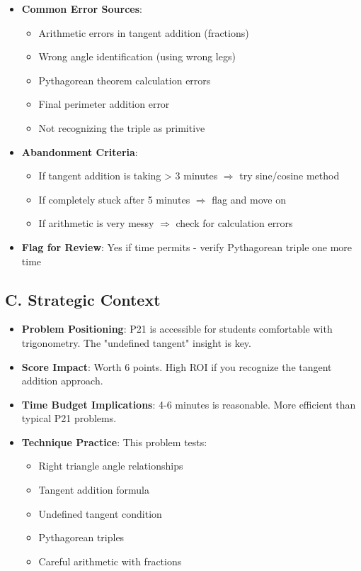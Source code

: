 \documentclass[12pt]{article}
\begin{document}
\begin{competitionbox}
\begin{itemize}[leftmargin=*]
    \item \textbf{Common Error Sources}:
    \begin{itemize}
        \item Arithmetic errors in tangent addition (fractions)
        \item Wrong angle identification (using wrong legs)
        \item Pythagorean theorem calculation errors
        \item Final perimeter addition error
        \item Not recognizing the triple as primitive
    \end{itemize}
    
    \item \textbf{Abandonment Criteria}: 
    \begin{itemize}
        \item If tangent addition is taking > 3 minutes $\Rightarrow$ try sine/cosine method
        \item If completely stuck after 5 minutes $\Rightarrow$ flag and move on
        \item If arithmetic is very messy $\Rightarrow$ check for calculation errors
    \end{itemize}
    
    \item \textbf{Flag for Review}: Yes if time permits - verify Pythagorean triple one more time
\end{itemize}

\subsection*{C. Strategic Context}
\begin{itemize}[leftmargin=*]
    \item \textbf{Problem Positioning}: P21 is accessible for students comfortable with trigonometry. The "undefined tangent" insight is key.
    
    \item \textbf{Score Impact}: Worth 6 points. High ROI if you recognize the tangent addition approach.
    
    \item \textbf{Time Budget Implications}: 4-6 minutes is reasonable. More efficient than typical P21 problems.
    
    \item \textbf{Technique Practice}: This problem tests:
    \begin{itemize}
        \item Right triangle angle relationships
        \item Tangent addition formula
        \item Undefined tangent condition
        \item Pythagorean triples
        \item Careful arithmetic with fractions
    \end{itemize}
\end{itemize}
\end{competitionbox}
\end{document}
